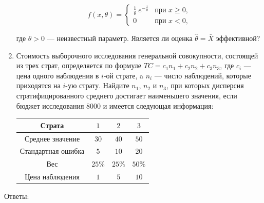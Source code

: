\begin{enumerate}
\[
f(x,\theta) =
\begin{cases}
\frac{1}{\theta} \ e^{-\frac{x}{\theta}} & \text{при } x \geq 0, \\
0 & \text{при } x < 0, \end{cases}
\]

где $\theta > 0$ — неизвестный параметр. Является ли оценка  $\hat{\theta} = \bar{X}$ эффективной?

\item Стоимость выборочного исследования генеральной совокупности, состоящей из трех страт, определяется по формуле $TC = c_1n_1 + c_2n_2 + c_3n_3$, где $c_i$ — цена одного наблюдения в $i$-ой страте, a $n_i$ — число наблюдений, которые приходятся на $i$-ую страту. Найдите $n_1$, $n_2$ и $n_3$, при которых дисперсия стратифицированного среднего достигает наименьшего значения, если бюджет исследования 8000 и имеется следующая информация:

\begin{center}
\begin{tabular}{cccc}
\toprule
 Страта & $1$ & $2$ & $3$  \\
 \midrule
 Среднее значение & $30$ & $40$ & $50$ \\
 Стандартная ошибка  & $5$ & $10$ & $20$ \\
 Вес & $25\%$ & $25\%$ & $50\%$ \\
 Цена наблюдения & $1$ & $5$ & $10$ \\
 \bottomrule
\end{tabular}
\end{center}

\end{enumerate}

Ответы:

